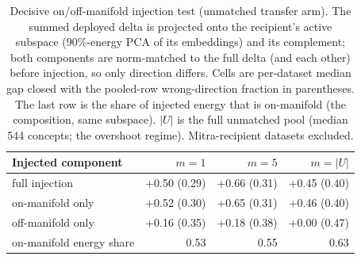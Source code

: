 \begin{table}[t]
\centering
\small
\setlength{\tabcolsep}{6pt}
\begin{tabular}{l r r r}
\toprule
Injected component & $m{=}1$ & $m{=}5$ & $m{=}|U|$ \\
\midrule
full injection & +0.50 (0.29) & +0.66 (0.31) & +0.45 (0.40) \\
on-manifold only & +0.52 (0.30) & +0.65 (0.31) & +0.46 (0.40) \\
off-manifold only & +0.16 (0.35) & +0.18 (0.38) & +0.00 (0.47) \\
\midrule
on-manifold energy share & 0.53 & 0.55 & 0.63 \\
\bottomrule
\end{tabular}
\caption{%
  Decisive on/off-manifold injection test (unmatched transfer arm). The   summed deployed delta is projected onto the recipient's active subspace   (90\%-energy PCA of its embeddings) and its complement; both components   are norm-matched to the full delta (and each other) before injection, so   only direction differs. Cells are per-dataset median gap closed with the   pooled-row wrong-direction fraction in parentheses. The last row is the   share of injected energy that is on-manifold (the composition, same   subspace). $|U|$ is the full unmatched pool (median 544   concepts; the overshoot regime). Mitra-recipient datasets excluded.
}
\label{tab:transfer_split}
\end{table}